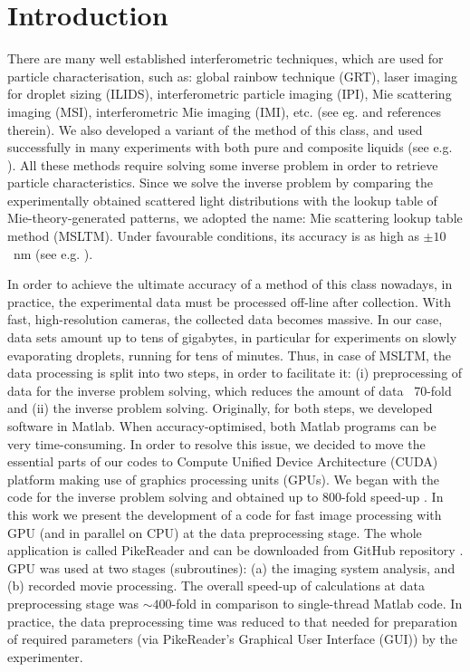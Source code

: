 \documentclass[preprint,review,12pt,dvips]{elsarticle}
\begin{document}
\section{Introduction}
There are many well established interferometric techniques, which are used for particle characterisation, such as: global
rainbow technique (GRT), laser imaging for droplet sizing (ILIDS), interferometric particle imaging (IPI), Mie scattering
imaging (MSI), interferometric Mie imaging (IMI), etc. (see eg. \cite{Dehaeck} and references therein). We also developed
a variant of the method of this class, and used successfully in many experiments with both pure and composite liquids (see
e.g. \cite{N2andAir,liquids,RoP,weightvsscatt,Hi-precission}). All these methods require solving some inverse problem in
order to retrieve particle characteristics. Since we solve the inverse problem by comparing the experimentally obtained
scattered light distributions with the lookup table of Mie-theory-generated patterns, we adopted the name: Mie scattering
lookup table method (MSLTM). Under favourable conditions, its accuracy is as high as $\pm 10$~nm (see e.g.
\cite{Hi-precission}).

In order to achieve the ultimate accuracy of a method of this class nowadays, in practice, the experimental data must be
processed off-line after collection. With fast, high-resolution cameras, the collected data becomes massive. In our case,
data sets amount up to tens of gigabytes, in particular for experiments on slowly evaporating droplets, running for tens
of minutes. Thus, in case of MSLTM, the data processing is split into two steps, in order to facilitate it: (i)
preprocessing of data for the inverse problem solving, which reduces the amount of data ~70-fold and (ii) the inverse
problem solving. Originally, for both steps, we developed software in Matlab. When accuracy-optimised, both Matlab
programs can be very time-consuming. In order to resolve this issue, we decided to move the essential parts of our codes
to Compute Unified Device Architecture (CUDA) platform making use of graphics processing units (GPUs). We began with the
code for the inverse problem solving and obtained up to 800-fold speed-up \cite{Smigacz}. In this work we present the
development of a code for fast image processing with GPU (and in parallel on CPU) at the data preprocessing stage. The
whole application is called PikeReader and can be downloaded from GitHub repository \cite{PikeReader}. GPU was used at two
stages (subroutines): (a) the imaging system analysis, and (b) recorded movie processing. The overall speed-up of
calculations at data preprocessing stage was $\sim 400$-fold in comparison to single-thread Matlab code. In practice, the
data preprocessing time was reduced to that needed for preparation of required parameters (via PikeReader's Graphical User
Interface (GUI)) by the experimenter.
\end{document}
